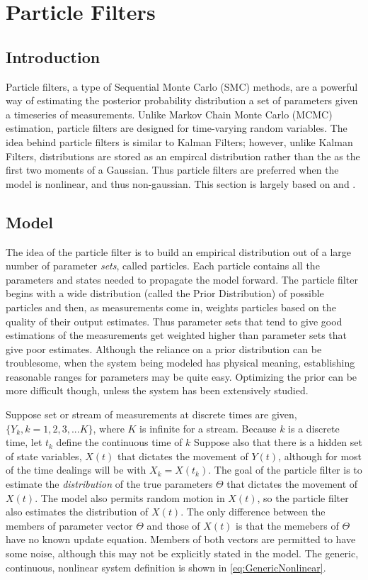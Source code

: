 \chapter{Particle Filters}
\label{sec:Particle Filter}
\section{Introduction}
Particle filters, a type of Sequential Monte Carlo (SMC) methods,
are a powerful way of estimating the posterior probability distribution
a set of parameters given a timeseries of measurements. Unlike Markov 
Chain Monte Carlo (MCMC) estimation, particle filters are designed for 
time-varying random variables. The idea behind particle filters is
similar to Kalman Filters; however, unlike Kalman Filters,
distributions are stored as an empircal distribution rather than the
as the first two moments of a Gaussian. Thus particle filters are 
preferred when the model is nonlinear, and thus non-gaussian. This section
is largely based on \cite{Arulampalam2002a} and \cite{Thrun2005}.

\section{Model}
\label{sec:Particle Filter Model}
The idea of the particle filter is to build an empirical distribution
out of a large number of parameter \emph{sets}, called particles. Each
particle contains all the parameters and states needed to propagate
the model forward.  The particle filter begins with a wide distribution 
(called the Prior Distribution)
of possible particles and then, as measurements come in, weights 
particles based on the quality of their output estimates. Thus parameter sets 
that tend to give good estimations of the measurements get weighted higher
than parameter sets that give poor estimates. Although the reliance on
a prior distribution can be troublesome, when the system being modeled
has physical meaning, establishing reasonable ranges for parameters may be 
quite easy. Optimizing the prior can be more difficult though,
unless the system has been extensively studied.

Suppose set or stream of measurements at discrete times are given, 
$\{Y_k, k = 1, 2, 3, ... K\}$, where $K$ is infinite for a stream. 
Because $k$ is a discrete time, let $t_k$ define the continuous
time of $k$
Suppose also that there is a hidden set of state variables,
$X(t)$ that dictates the movement
of $Y(t)$, although for most of the time dealings will be
with $X_k = X(t_k)$. The goal of the particle filter is to estimate the 
\emph{distribution} of the
true parameters $\Theta$ that dictates the movement of $X(t)$.
The model also permits random motion in $X(t)$, so the 
particle filter also estimates the distribution of $X(t)$.
The only difference between the members of parameter vector
$\Theta$ and those of $X(t)$ is that the memebers of
$\Theta$ have no known update equation. Members of both vectors
are permitted to have some noise, although this
may not be explicitly stated in the model. The generic, continuous, nonlinear
system definition is shown in \autoref{eq:GenericNonlinear}.

